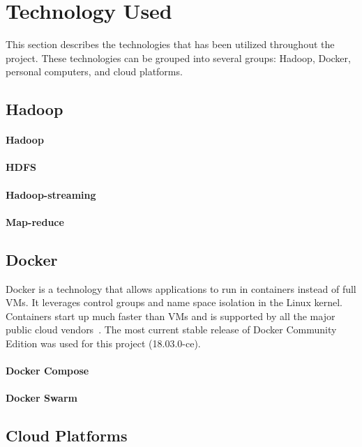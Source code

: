 \section{Technology Used}\label{s:techused}

This section describes the technologies that has been utilized
throughout the project. These technologies can be grouped into several
groups: Hadoop, Docker, personal computers, and cloud platforms.

\subsection{Hadoop}

\paragraph{Hadoop}
\paragraph{HDFS}
\paragraph{Hadoop-streaming}
\paragraph{Map-reduce}


\subsection{Docker}
Docker is a technology that allows applications to run in containers
instead of full VMs. It leverages control groups and name space
isolation in the Linux kernel. Containers start up much faster than
VMs and is supported by all the major public cloud
vendors~\cite{Foster:2017:CCS:3158276}. The most current stable
release of Docker Community Edition was used for this project
(18.03.0-ce).
\paragraph{Docker Compose}
\paragraph{Docker Swarm}


\subsection{Cloud Platforms}
